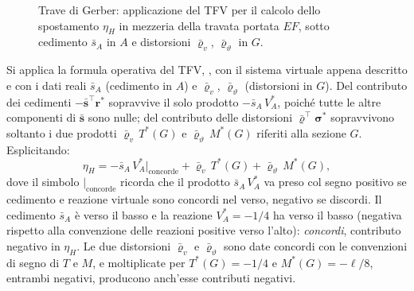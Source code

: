 \begin{esempio}
\begin{svolgimento}
\begin{figure}[htbp]
{%
			}
			\caption{Trave di Gerber: applicazione del TFV per il calcolo 
				dello spostamento $\eta_H$ in mezzeria della travata portata 
				$EF$, sotto cedimento $\bar s_A$ in $A$ e distorsioni 
				$\bar\varrho_v$, $\bar\varrho_\vartheta$ in $G$.}
			\label{fig:TFV_gerber}
		\end{figure}
		
		
		Si applica la formula operativa del TFV, , 
		con il sistema virtuale appena descritto e con i dati reali 
		$\bar s_A$ (cedimento in $A$) e $\bar\varrho_v$, 
		$\bar\varrho_\vartheta$ (distorsioni in $G$). Del contributo dei 
		cedimenti $-\bar{\bm{s}}^\top\bm{r}^{*}$ sopravvive il solo 
		prodotto $-\bar s_A\,V_A^{*}$, poiché tutte le altre componenti 
		di $\bar{\bm s}$ sono nulle; del contributo delle distorsioni 
		$\bar{\bm{\varrho}}^\top\bm{\sigma}^{*}$ sopravvivono soltanto 
		i due prodotti $\bar\varrho_v\,T^{*}(G)$ e 
		$\bar\varrho_\vartheta\,M^{*}(G)$ riferiti alla sezione $G$. 
		Esplicitando:
		\begin{equation*}
			\eta_H = -\bar s_A\,V_A^{*}\big|_{\text{concorde}} 
			+ \bar\varrho_v\,T^{*}(G)
			+ \bar\varrho_\vartheta\,M^{*}(G),
		\end{equation*}
		dove il simbolo $\big|_{\text{concorde}}$ ricorda che il prodotto 
		$\bar s_A\,V_A^{*}$ va preso col segno positivo se cedimento e 
		reazione virtuale sono concordi nel verso, negativo se discordi. 
		Il cedimento $\bar s_A$ è verso il basso e la reazione 
		$V_A^{*}=-1/4$ ha verso il basso (negativa rispetto alla 
		convenzione delle reazioni positive verso l'alto): \emph{concordi}, 
		contributo negativo in $\eta_H$. Le due distorsioni $\bar\varrho_v$ 
		e $\bar\varrho_\vartheta$ sono date concordi con le convenzioni 
		di segno di $T$ e $M$, e moltiplicate per $T^{*}(G)=-1/4$ e 
		$M^{*}(G)=-\ell/8$, entrambi negativi, producono anch'esse 
		contributi negativi.
		

\end{svolgimento}
\end{esempio}
